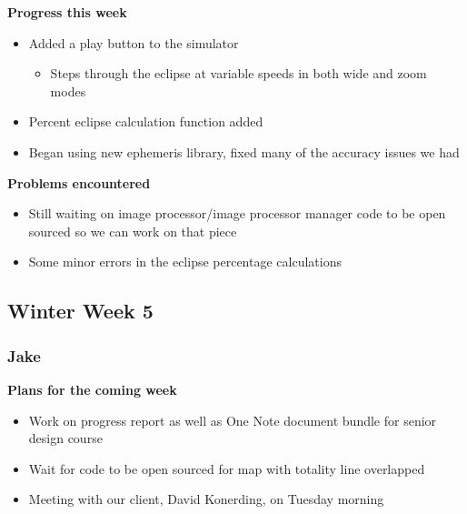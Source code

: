 \documentclass[10pt, onecolumn, draftclsnofoot, letterpaper, compsoc]{IEEEtran}
\begin{document}
    \noindent \textbf{Progress this week}

    \begin{itemize}

    \item Added a play button to the simulator

    \begin{itemize}
      \item Steps through the eclipse at variable speeds in both wide and zoom modes
    \end{itemize}

    \item Percent eclipse calculation function added
    \item Began using new ephemeris library, fixed many of the accuracy issues we had

    \end{itemize}

    \noindent \textbf{Problems encountered}

    \begin{itemize}

    \item Still waiting on image processor/image processor manager code to be open sourced so we can work on that piece
    \item Some minor errors in the eclipse percentage calculations

    \end{itemize}

\subsection{Winter Week 5}

    \subsubsection{Jake}

    \noindent \textbf{Plans for the coming week}

    \begin{itemize}

    \item Work on progress report as well as One Note document bundle for senior design course
    \item Wait for code to be open sourced for map with totality line overlapped
    \item Meeting with our client, David Konerding, on Tuesday morning

    \end{itemize}
\end{document}

